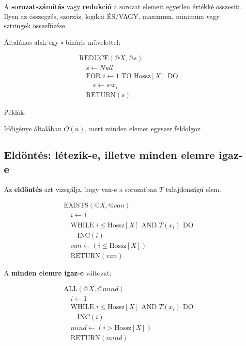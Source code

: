A \textbf{sorozatszámítás} vagy \textbf{redukció} a sorozat elemeit egyetlen értékké összesíti. Ilyen az összegzés, szorzás, logikai ÉS/VAGY, maximum, minimum vagy sztringek összefűzése.

Általános alak egy $\square$ bináris művelettel:

\[
\begin{aligned}
&\text{REDUCE}(@X,@s)\\
&\quad s\leftarrow Null\\
&\quad \text{FOR } i\leftarrow 1 \text{ TO Hossz}[X] \text{ DO}\\
&\quad\quad s\leftarrow s\square x_i\\
&\quad \text{RETURN}(s)
\end{aligned}
\]

Példák:

\begin{center}

\end{center}

Időigénye általában $O(n)$, mert minden elemet egyszer feldolgoz.

\subsection{Eldöntés: létezik-e, illetve minden elemre igaz-e}

Az \textbf{eldöntés} azt vizsgálja, hogy van-e a sorozatban $T$ tulajdonságú elem.

\[
\begin{aligned}
&\text{EXISTS}(@X,@van)\\
&\quad i\leftarrow 1\\
&\quad \text{WHILE } i\leq \text{Hossz}[X] \text{ AND } \overline{T(x_i)} \text{ DO}\\
&\quad\quad \text{INC}(i)\\
&\quad van\leftarrow (i\leq \text{Hossz}[X])\\
&\quad \text{RETURN}(van)
\end{aligned}
\]

A \textbf{minden elemre igaz-e} változat:

\[
\begin{aligned}
&\text{ALL}(@X,@mind)\\
&\quad i\leftarrow 1\\
&\quad \text{WHILE } i\leq \text{Hossz}[X] \text{ AND } T(x_i) \text{ DO}\\
&\quad\quad \text{INC}(i)\\
&\quad mind\leftarrow (i>\text{Hossz}[X])\\
&\quad \text{RETURN}(mind)
\end{aligned}
\]

